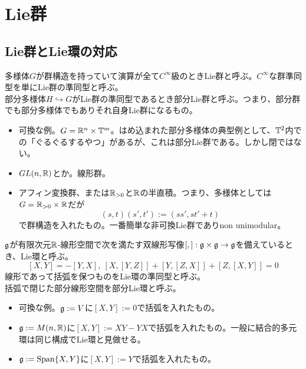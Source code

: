 \section{Lie群}


\subsection{Lie群とLie環の対応}
\begin{defi}[Lie群]
    多様体$G$が群構造を持っていて演算が全て$C^\infty$級のときLie群と呼ぶ。$C^\infty$な群準同型を単にLie群の準同型と呼ぶ。\\
	部分多様体$H\hookrightarrow G$がLie群の準同型であるとき部分Lie群と呼ぶ\footnotemark。つまり、部分群でも部分多様体でもありそれ自身Lie群になるもの。
\end{defi}
\begin{eg}
    \begin{itemize}
        \item 可換な例。$G=\mathbb{R}^n\times\mathbb{T}^m$。はめ込まれた部分多様体の典型例として、$\mathbb{T}^2$内での「ぐるぐるするやつ」があるが、これは部分Lie群である。しかし閉ではない。
        \item $GL(n,\mathbb{R})$とか。線形群。
        \item アフィン変換群、または$\mathbb{R}_{>0}$と$\mathbb{R}$の半直積。つまり、多様体としては$G=\mathbb{R}_{>0}\times\mathbb{R}$だが
        \[(s,t)(s',t'):=(ss',st'+t)\]
        で群構造を入れたもの。一番簡単な非可換Lie群でありnon unimodular。
    \end{itemize}
\end{eg}

\begin{defi}[Lie環]
    $\mathfrak{g}$が有限次元$\mathbb{R}$-線形空間で次を満たす双線形写像$[,]:\mathfrak{g}\times\mathfrak{g}\to\mathfrak{g}$を備えているとき、Lie環と呼ぶ。
    \[[X,Y]=-[Y,X],\ [X,[Y,Z]]+[Y,[Z,X]]+[Z,[X,Y]]=0\]
    線形であって括弧を保つものをLie環の準同型と呼ぶ。\\
    括弧で閉じた部分線形空間を部分Lie環と呼ぶ。
\end{defi}
\begin{eg}
    \begin{itemize}
        \item 可換な例。$\mathfrak{g}:=V$に$[X,Y]:=0$で括弧を入れたもの。
        \item $\mathfrak{g}:=M(n,\mathbb{R})$に$[X,Y]:=XY-YX$で括弧を入れたもの。一般に結合的多元環は同じ構成でLie環と見做せる。
        \item $\mathfrak{g}:=\mathrm{Span}\{X,Y\}$に$[X,Y]:=Y$で括弧を入れたもの。
    \end{itemize}
\end{eg}


